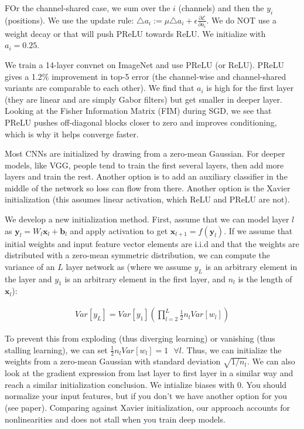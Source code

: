 \documentclass[a4paper]{article}
\begin{document}
FOr the channel-shared case, we sum over the $i$ (channels) and then the $y_i$
(positions). We use the update rule:
$\triangle a_i := \mu \triangle a_i + \epsilon
\frac{\partial \mathcal{E}}{\partial a_i}$. We do NOT use a weight decay or
that will push PReLU towards ReLU. We initialize with $a_i = 0.25$.

We train a 14-layer convnet on ImageNet and use PReLU (or ReLU). PReLU gives
a 1.2\% improvement in top-5 error (the channel-wise and channel-shared
variants are comparable to each other). We find that $a_i$ is high for
the first layer (they are linear and are simply Gabor filters) but get
smaller in deeper layer. Looking at the Fisher Information Matrix (FIM) during
SGD, we see that PReLU pushes off-diagonal blocks closer to zero and improves
conditioning, which is why it helps converge faster.

Most CNNs are initialized by drawing from a zero-mean Gaussian. For deeper
models, like VGG, people tend to train the first several layers, then add more
layers and train the rest. Another option is to add an auxiliary classifier
in the middle of the network so loss can flow from there. Another option is the
Xavier initialization (this assumes linear activation, which ReLU and PReLU are
not).

We develop a new initialization method. First, assume that we can model layer
$l$ as $\bm{y}_l = W_l \bm{x}_l + \bm{b}_l$ and apply activation to get
$\bm{x}_{l+1} = f(\bm{y}_l)$. If we assume that initial weights and input
feature vector elements are i.i.d and that the weights are distributed with
a zero-mean symmetric distribution, we can compute the variance of an $L$
layer network as (where we assume $y_L$ is an arbitrary element in the layer and
$y_1$ is an arbitrary element in the first layer, and $n_l$ is the length of
$\bm{x}_l$):

\begin{align}
  Var[y_L] = Var[y_1] (\prod_{l=2}^{L}{\frac{1}{2} n_l Var[w_l]})
\end{align}

To prevent this from exploding (thus diverging learning) or vanishing (thus
stalling learning), we can set $\frac{1}{2} n_l
Var[w_l] = 1 \text{ } \forall l$. Thus, we can initialize the weights from a
zero-mean Gaussian with standard deviation $\sqrt{1/n_l}$. We can also
look at the gradient expression from last layer to first layer in a similar
way and reach a similar initialization conclusion. We intialize biases with 0.
You should normalize your input features, but if you don't we have another
option for you (see paper). Comparing against Xavier initialization, our
approach accounts for nonlinearities and does not stall when you train deep
models.
\end{document}
